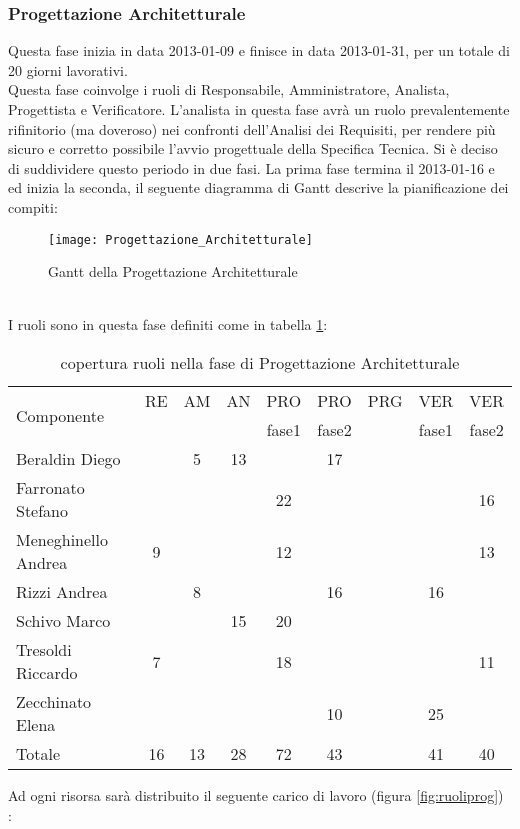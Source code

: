 \subsubsection{Progettazione Architetturale}
Questa fase inizia in data 2013-01-09 e finisce in data 2013-01-31, per un totale di 20 giorni lavorativi. \\
Questa fase coinvolge i ruoli di Responsabile, Amministratore, Analista, Progettista e Verificatore.
L'analista in questa fase avrà un ruolo prevalentemente rifinitorio (ma doveroso) nei confronti dell'Analisi dei Requisiti, per rendere più sicuro e corretto possibile l'avvio progettuale della Specifica Tecnica.
Si è deciso di suddividere questo periodo in due fasi. La prima fase termina il 2013-01-16 e ed inizia la seconda, il seguente diagramma di Gantt descrive la pianificazione dei compiti:\\
\begin{figure}[h]
  \texttt{[image: Progettazione\_Architetturale]}
\caption{Gantt della Progettazione Architetturale }
\end{figure}\\
I ruoli sono in questa fase definiti come in tabella \ref{tab:ruoliprog}:\\
\begin{table}[h]
\centering
\begin{tabular}{|l|c|c|c|c|c|c|c|c|}
\hline
\multirow{2}{*}{Componente}& RE& AM& AN& PRO& PRO& PRG& VER& VER\\
                    &    &      &      &fase1          &fase2         &        &fase1	 &fase2\\ 
\hline
Beraldin Diego & & 5& 13& & 17& & &\\
Farronato Stefano & & & & 22& & & & 16\\
Meneghinello Andrea & 9& & & 12& & & & 13\\
Rizzi Andrea & & 8& & & 16& & 16& \\
Schivo Marco & & & 15& 20& & & & \\
Tresoldi Riccardo & 7& & & 18& & & & 11\\
Zecchinato Elena & & & & & 10& & 25& \\
\hline
Totale & 16& 13& 28& 72& 43& & 41& 40\\
\hline
\end{tabular}
\caption{copertura ruoli nella fase di Progettazione Architetturale}\label{tab:ruoliprog}
\end{table}
\clearpage
Ad ogni risorsa sarà distribuito il seguente carico di lavoro (figura \ref{fig:ruoliprog}) :\\
